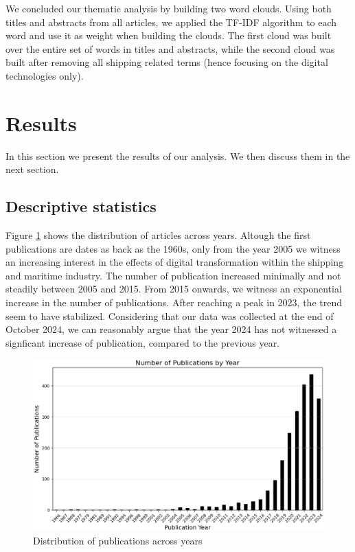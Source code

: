\documentclass[a4paper, review, endfloat, authoryear]{elsarticle}
\begin{document}
	We concluded our thematic analysis by building two word clouds. Using both titles and abstracts from all articles, we applied the TF-IDF algorithm to each word and use it as weight when building the clouds. The first cloud was built over the entire set of words in titles and abstracts, while the second cloud was built after removing all shipping related terms (hence focusing on the digital technologies only).
	
	\section{Results}
	In this section we present the results of our analysis. We then discuss them in the next section.
	
	\subsection{Descriptive statistics}
	Figure \ref{fig:fig1} shows the distribution of articles across years. Altough the first publications are dates as back as the 1960s, only from the year 2005 we witness an increasing interest in the effects of digital transformation within the shipping and maritime industry. The number of publication increased minimally and not steadily between 2005 and 2015. From 2015 onwards, we witness an exponential increase in the number of publications. After reaching a peak in 2023, the trend seem to have stabilized. Considering that our data was collected at the end of October 2024, we can reasonably argue that the year 2024 has not witnessed a signficant increase of publication, compared to the previous year.
	
	\begin{figure}[htbp]
		\centering
		\includegraphics[width=\linewidth]{pics/no_publications_year.eps}
		\caption{Distribution of publications across years}\label{fig:fig1}
	\end{figure}
	
\end{document}
